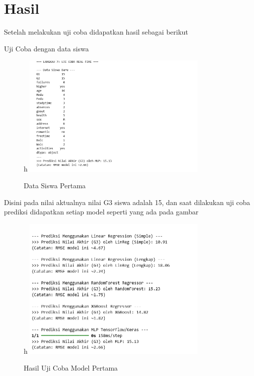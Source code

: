 
\chapter*{Hasil}

Setelah melakukan uji coba didapatkan hasil sebagai berikut


Uji Coba dengan data siswa 

\begin{figure}{h}
    \centering
    \includegraphics[width=0.8\textwidth]{images/datasiswa2.png}
    \caption{Data Siswa Pertama}
    \label{fig:hasil}
\end{figure}

Disini pada nilai aktualnya nilai G3 siswa adalah 15, dan saat dilakukan uji coba prediksi didapatkan setiap model seperti yang ada pada gambar

\begin{figure}{h}
    \centering
    \includegraphics[width=0.8\textwidth]{images/hasil2.png}
    \caption{Hasil Uji Coba Model Pertama}
    \label{fig:hasil}
\end{figure}


